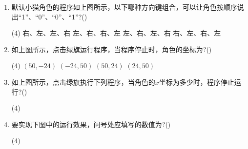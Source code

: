 \documentclass[10pt, a4paper]{article}
\begin{document}
\begin{enumerate}
        \item 默认小猫角色的程序如上图所示，以下哪种方向键组合，可以让角色按顺序说出“1”、“0”、“0”、“1”?(\qquad)
        \begin{tasks}(4)
            \task 右、左、左、右
            \task 左、右、右、左
            \task 左、右、左、右
            \task 右、左、右、左
        \end{tasks}

        \item 如上图所示，点击绿旗运行程序，当程序停止时，角色的坐标为?(\qquad)
        \begin{tasks}(4)
            \task $(50, -24)$
            \task $(-24, 50)$
            \task $(50, 24)$
            \task $(24, 50)$
        \end{tasks}

        \item 如上图所示，点击绿旗执行下列程序，当角色的$x$坐标为多少时，程序停止运行?(\qquad)
        \begin{tasks}(4)
        \end{tasks}

        \item 要实现下图中的运行效果，问号处应填写的数值为?(\qquad)
        \begin{tasks}(4)
        \end{tasks}


\end{enumerate}
\end{document}
